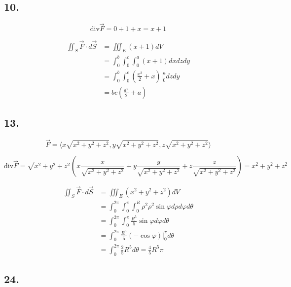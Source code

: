 \documentclass{article}
\begin{document}
  \subsection*{10.}

  $$\textrm{div} \overrightarrow F = 0 + 1 + x = x + 1$$

  $$\begin{aligned}
    \iint_S \overrightarrow F \cdot d \overrightarrow S &= \iiint_E (x + 1) dV \\
                                                        &= \int_0^b \int_0^c \int_0^a (x + 1) dx dz dy \\
                                                        &= \int_0^b \int_0^c (\frac{x^2}{2} + x)\biggl|_0^a dz dy \\
                                                        &= bc (\frac{a^2}{2} + a)
  \end{aligned}
  $$

  \subsection*{13.}

  $$\overrightarrow F = \langle x \sqrt{x^2 + y^2 + z^2}, y \sqrt{x^2 + y^2 + z^2}, z \sqrt{x^2 + y^2 + z^2} \rangle$$

  $$\textrm{div} \overrightarrow F = \sqrt{x^2 + y^2 + z^2} (x \frac{x}{\sqrt{x^2 + y^2 + z^2}} + y \frac{y}{\sqrt{x^2 + y^2 + z^2}} + z \frac{z}{\sqrt{x^2 + y^2 + z^2}}) = x^2 + y^2 + z^2$$

  $$\begin{aligned}
    \iint_S \overrightarrow F \cdot d \overrightarrow S &= \iiint_E (x^2 + y^2 + z^2) dV \\
                                                        &= \int_0^{2\pi} \int_0^\pi \int_0^R \rho^2 \rho^2 \sin \varphi d\rho d\varphi d\theta \\
                                                        &= \int_0^{2\pi} \int_0^\pi \frac{R^5}{5} \sin \varphi d\varphi d\theta \\
                                                        &= \int_0^{2\pi} \frac{R^5}{5} (-\cos \varphi)\biggl|_0^\pi d\theta \\
                                                        &= \int_0^{2\pi} \frac{2}{5}R^5 d\theta = \frac{4}{5}R^5 \pi
  \end{aligned}
  $$

  \subsection*{24.}
\end{document}
